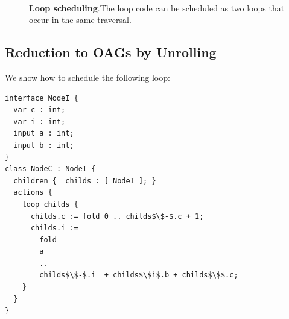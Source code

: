 \begin{figure}
\centering
{}\\
\caption{\textbf{Loop scheduling}.The loop code can be scheduled as two loops that occur in the same traversal.}
\label{fig:unrolling}
\end{figure}



\subsection{Reduction to OAGs by Unrolling}
We show how to schedule the following loop:

\begin{lstlisting}[mathescape]
interface NodeI {
  var c : int;
  var i : int;
  input a : int;
  input b : int;
}
class NodeC : NodeI {
  children {  childs : [ NodeI ]; }
  actions {
    loop childs {
      childs.c := fold 0 .. childs$\$-$.c + 1;
      childs.i := 
        fold 
        a 
        ..         
        childs$\$-$.i  + childs$\$i$.b + childs$\$$.c;
    }
  }
}
\end{lstlisting}

